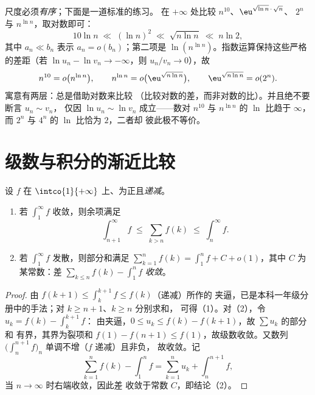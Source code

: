 \begin{example}[为一群“怪兽”排序]\label{ex:b2:comparison:ranking}
尺度必须\emph{有序}；下面是一道标准的练习。
在 $+\infty$ 处比较 $n^{10}$、$\eu^{\sqrt{\ln n}\,\cdot\,\sqrt n}$、
$2^n$ 与 $n^{\ln n}$，取对数即可：
\[
10\ln n
\;\ll\; (\ln n)^2
\;\ll\; \sqrt{n\ln n}
\;\ll\; n\ln 2 ,
\]
其中 $a_n \ll b_n$ 表示 $a_n = o(b_n)$；第二项是
$\ln(n^{\ln n})$。指数运算保持这些严格的差距（若
$\ln u_n - \ln v_n \to -\infty$，则 $u_n/v_n \to 0$），故
\[
n^{10} = o\bigl(n^{\ln n}\bigr),
\qquad
n^{\ln n} = o\bigl(\eu^{\sqrt{n\ln n}}\bigr),
\qquad
\eu^{\sqrt{n\ln n}} = o(2^n) .
\]
寓意有两层：总是借助对数来比较
（比较对数的差，而非对数的比）。并且绝不要断言 $u_n \sim v_n$，
仅因 $\ln u_n \sim \ln v_n$ 成立——数对 $n^{10}$
与 $n^{\ln n}$ 的 $\ln$ 比趋于 $\infty$，而 $2^n$
与 $4^n$ 的 $\ln$ 比恰为 $2$，二者却
彼此极不等价。
\end{example}

\section{级数与积分的渐近比较}

\begin{theorem}\label{thm:b2:comparison:seriesintegral}
设 $f$ 在
$\intco{1}{+\infty}$ 上、为正且\emph{递减}。
\begin{enumerate}
  \item 若 $\int_1^{\infty} f$ 收敛，则余项满足
        \[
        \int_{n+1}^{\infty} f \;\leq\; \sum_{k > n} f(k) \;\leq\;
        \int_{n}^{\infty} f .
        \]
  \item 若 $\int_1^\infty f$ 发散，则部分和满足
        $\sum_{k=1}^{n} f(k) = \int_1^n f + C + o(1)$，其中
        $C$ 为某常数：差 $\sum_{k \leq n} f(k) -
        \int_1^n f$ \emph{收敛}。
\end{enumerate}
\end{theorem}

\begin{proof}
由 $f(k+1) \leq \int_k^{k+1} f \leq f(k)$（递减）所作的
夹逼，已是本科一年级分册中的手法；对 $k \geq n+1$、$k \geq n$ 分别求和，
可得（1）。对（2），令 $u_k = f(k) - \int_k^{k+1} f$：
由夹逼，$0 \leq u_k \leq f(k) - f(k+1)$，故 $\sum u_k$ 的部分和
有界，其界为裂项和 $f(1) - f(n+1) \leq
f(1)$，故级数收敛。又数列 $\bigl(\int_n^{n+1}
f\bigr)_n$ 单调不增（$f$ 递减）且非负，
故收敛。记
\[
\sum_{k=1}^{n} f(k) - \int_1^n f
= \sum_{k=1}^{n} u_k + \int_n^{n+1} f ,
\]
当 $n \to \infty$ 时右端收敛，因此差
收敛于常数 $C$，即结论（2）。
\end{proof}

